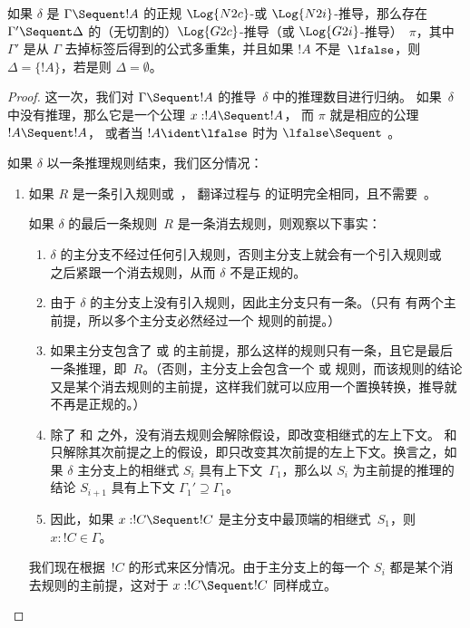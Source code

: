 \documentclass[../../../include/open-logic-section]{subfiles}
\begin{document}
\begin{prop} 如果 $\delta$ 是 $\Gamma \Sequent !A$ 的正规 $\Log{N2c}$-或 $\Log{N2i}$-推导，那么存在 $\Gamma' \Sequent \Delta$ 的（无切割的）$\Log{G2c}$-推导（或 $\Log{G2i}$-推导）~$\pi$，其中 $\Gamma'$ 是从 $\Gamma$ 去掉标签后得到的公式多重集，并且如果 $!A$ 不是~$\lfalse$，则 $\Delta = \{!A\}$，若是则 $\Delta = \emptyset$。
\end{prop}

\begin{proof}
这一次，我们对 $\Gamma \Sequent !A$ 的推导~$\delta$ 中的推理数目进行归纳。
如果~$\delta$ 中没有推理，那么它是一个公理 $x:!A \Sequent !A$，
而 $\pi$ 就是相应的公理 $!A \Sequent !A$，
或者当 $!A \ident \lfalse$ 时为 $\lfalse \Sequent \ $。

如果 $\delta$ 以一条推理规则结束，我们区分情况：
\begin{enumerate}
  \item 如果 $R$ 是一条引入规则或~\FalseInt，
  翻译过程与  的证明完全相同，且不需要~\Cut{}。

  如果 $\delta$ 的最后一条规则~$R$ 是一条消去规则，则观察以下事实：
  \begin{enumerate}
    \item $\delta$ 的主分支不经过任何引入规则，否则主分支上就会有一个引入规则或~\FalseInt{} 之后紧跟一个消去规则，从而 $\delta$ 不是正规的。
    \item 由于 $\delta$ 的主分支上没有引入规则，因此主分支只有一条。（只有 \Intro{\land} 有两个主前提，所以多个主分支必然经过一个 \Intro{\land} 规则的前提。）
    \item 如果主分支包含了 \Elim{\lor} 或 \Elim{\lexists} 的主前提，那么这样的规则只有一条，且它是最后一条推理，即~$R$。（否则，主分支上会包含一个 \Elim{\lor} 或 \Elim{\lexists} 规则，而该规则的结论又是某个消去规则的主前提，这样我们就可以应用一个置换转换，推导就不再是正规的。）
    \item 除了 \Elim{\lor} 和 \Elim{\lexists} 之外，没有消去规则会解除假设，即改变相继式的左上下文。\Elim{\lor} 和 \Elim{\lexists} 只解除其次前提之上的假设，即只改变其次前提的左上下文。换言之，如果 $\delta$ 主分支上的相继式 $S_i$ 具有上下文~$\Gamma_1$，那么以 $S_i$ 为主前提的推理的结论 $S_{i+1}$ 具有上下文 $\Gamma_1' \supseteq \Gamma_1$。
    \item 因此，如果 $x: !C \Sequent !C$ 是主分支中最顶端的相继式~$S_1$，则 $x:!C \in \Gamma$。
  \end{enumerate}
  我们现在根据~$!C$ 的形式来区分情况。由于主分支上的每一个 $S_i$ 都是某个消去规则的主前提，这对于 $x:!C \Sequent !C$ 同样成立。


\end{enumerate}
\end{proof}
\end{document}
